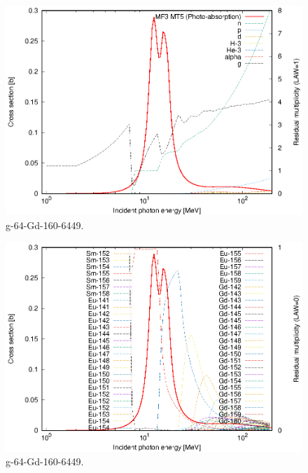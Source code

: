 \begin{figure}
 \includegraphics[width=\linewidth]{eps/g_64-Gd-160_6449.eps}
  \caption{g-64-Gd-160-6449.}
\end{figure}
\begin{figure}
 \includegraphics[width=\linewidth]{eps-law0/g_64-Gd-160_6449.eps}
 \caption{g-64-Gd-160-6449.}
\end{figure}
\newpage \clearpage

